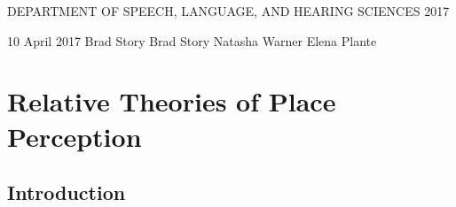 \documentclass[dissertation]{uathesis}\usepackage[]{graphicx}\usepackage[]{color}
\begin{document}
\maketitlepage
{DEPARTMENT OF SPEECH, LANGUAGE, AND HEARING SCIENCES}	%
{2017}							

\approval
{10 April 2017}		%
{Brad Story}	%
{Brad Story}	%
{Natasha Warner}		%
{Elena Plante}		%
{}		%
{}		%

\statementbyauthor



\tableofcontents

\listoffigures

\listoftables










%
\chapter{Relative Theories of Place Perception\label{chapter2}}


\section{Introduction}
\end{document}

